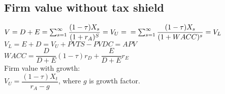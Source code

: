 \subsection*{Firm value without tax shield}
$V = D+E = \sum_{s=1}^\infty\dfrac{(1-\tau)X_s}{(1+r_A)^S}= V_U =\\ = \sum_{s=1}^\infty\dfrac{(1-\tau)X_s}{(1+WACC)^s}=V_L$\\
$V_L = E+D=V_U + PVTS - PVDC = APV$\\
$WACC = \dfrac{D}{D+E}(1-\tau)r_D + \dfrac{E}{D+E}r_E$\\
Firm value with growth:\\ $V_U = \dfrac{(1-\tau)X_t}{r_A-g}$, where $g$ is growth factor.
